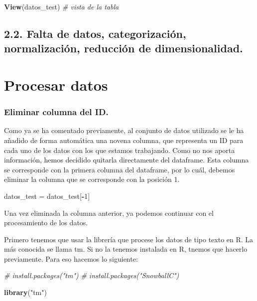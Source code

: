 \documentclass[spanish,]{article}
\newenvironment{Shaded}{\begin{snugshade}}{\end{snugshade}}
\newcommand{\KeywordTok}[1]{\textcolor[rgb]{0.13,0.29,0.53}{\textbf{#1}}}
\newcommand{\DecValTok}[1]{\textcolor[rgb]{0.00,0.00,0.81}{#1}}
\newcommand{\StringTok}[1]{\textcolor[rgb]{0.31,0.60,0.02}{#1}}
\newcommand{\CommentTok}[1]{\textcolor[rgb]{0.56,0.35,0.01}{\textit{#1}}}
\newcommand{\OperatorTok}[1]{\textcolor[rgb]{0.81,0.36,0.00}{\textbf{#1}}}
\newcommand{\NormalTok}[1]{#1}
\begin{document}
\begin{Shaded}
\begin{Highlighting}[]
\KeywordTok{View}\NormalTok{(datos_test)    }\CommentTok{# vista de la tabla}
\end{Highlighting}
\end{Shaded}

\subsection{2.2. Falta de datos, categorización, normalización,
reducción de
dimensionalidad.}\label{falta-de-datos-categorizacion-normalizacion-reduccion-de-dimensionalidad.}

\section{Procesar datos}\label{procesar-datos}

\subsubsection{Eliminar columna del ID.}\label{eliminar-columna-del-id.}

Como ya se ha comentado previamente, al conjunto de datos utilizado se
le ha añadido de forma automática una novena columna, que representa un
ID para cada uno de los datos con los que estamos trabajando. Como no
nos aporta información, hemos decidido quitarla directamente del
dataframe. Esta columna se corresponde con la primera columna del
dataframe, por lo cuál, debemos eliminar la columna que se corresponde
con la posición 1.

\begin{Shaded}
\begin{Highlighting}[]
\NormalTok{datos_test =}\StringTok{ }\NormalTok{datos_test[}\OperatorTok{-}\DecValTok{1}\NormalTok{]}
\end{Highlighting}
\end{Shaded}

Una vez eliminada la columna anterior, ya podemos continuar con el
procesamiento de los datos.

Primero tenemos que usar la librería que procese los datos de tipo texto
en R. La más conocida se llama tm. Si no la tenemos instalada en R,
tnemos que hacerlo previamente. Para eso hacemos lo siguiente:

\begin{Shaded}
\begin{Highlighting}[]
\CommentTok{# install.packages("tm")}
\CommentTok{# install.packages("SnowballC")}

\KeywordTok{library}\NormalTok{(}\StringTok{"tm"}\NormalTok{)}
\end{Highlighting}
\end{Shaded}
\end{document}
